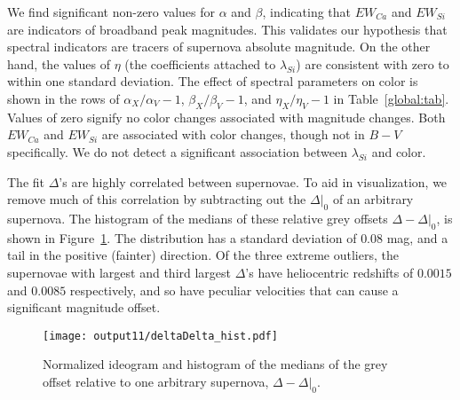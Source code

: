 \documentclass{aastex61}   	%
\begin{document}
We find significant non-zero values for $\alpha$ and $\beta$, indicating that $EW_{Ca}$ and $EW_{Si}$ are indicators of broadband
peak magnitudes.
This validates our hypothesis that spectral indicators
are tracers of supernova absolute magnitude.  On the other hand, the values of $\eta$ (the coefficients attached to $\lambda_{Si}$) are consistent with zero
to  within one standard deviation.
The effect of spectral parameters on color is shown in the rows of $\alpha_X/\alpha_V-1$,  $\beta_X/\beta_V-1$, and  $\eta_X/\eta_V-1$
in Table~\ref{global:tab}.
Values of zero signify no color changes associated with magnitude changes.
Both $EW_{Ca}$ and $EW_{Si}$ are associated with color changes, though not in $B-V$ specifically.
We do not detect a significant association between
$\lambda_{Si}$ and color.

\color{purple}
The fit $\Delta$'s are highly correlated between supernovae.  To aid in visualization, we remove much of this
correlation by subtracting out the $\Delta|_0$ of  an arbitrary supernova.
The histogram of the medians of these relative  grey offsets $\Delta-\Delta|_0$,
is shown in Figure~\ref{hist:fig}.  The distribution
has a standard deviation of
$0.08$
mag, and a tail in the positive (fainter) direction. 
Of the three extreme outliers, the supernovae with largest and third largest $\Delta$'s have  heliocentric redshifts of 
 $0.0015$ and $0.0085$ respectively, and so have peculiar velocities that can cause a significant magnitude offset.
\color{black}
\begin{figure}[htbp] %
   \centering
   \texttt{[image: output11/deltaDelta\_hist.pdf]} 
   \caption{
   \color{purple}
   Normalized ideogram and histogram of the medians of the grey offset relative to one arbitrary supernova, $\Delta-\Delta|_0$.  
   \color{black}
   \label{hist:fig}}
\end{figure}
\end{document}

